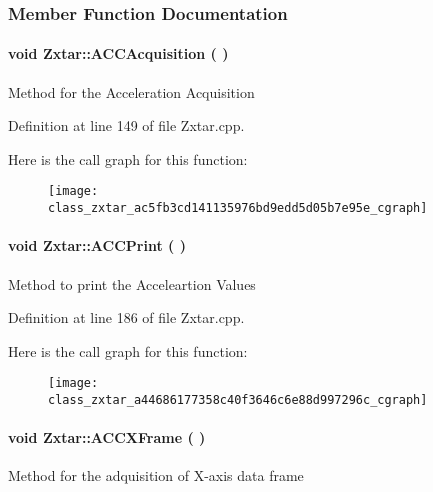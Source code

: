 \begin{appendices}
\subsubsection{\-Member \-Function \-Documentation}
\paragraph[{\-A\-C\-C\-Acquisition}]{\setlength{\rightskip}{0pt plus 5cm}void {\bf \-Zxtar\-::\-A\-C\-C\-Acquisition} (
)}\label{class_zxtar_ac5fb3cd141135976bd9edd5d05b7e95e}
\-Method for the \-Acceleration \-Acquisition 

\-Definition at line 149 of file \-Zxtar.\-cpp.



\-Here is the call graph for this function\-:\nopagebreak
\begin{figure}[H]
\begin{center}
\leavevmode
\texttt{[image: class\_zxtar\_ac5fb3cd141135976bd9edd5d05b7e95e\_cgraph]}
\end{center}
\end{figure}


\paragraph[{\-A\-C\-C\-Print}]{\setlength{\rightskip}{0pt plus 5cm}void {\bf \-Zxtar\-::\-A\-C\-C\-Print} (
)}\label{class_zxtar_a44686177358c40f3646c6e88d997296c}
\-Method to print the \-Acceleartion \-Values 

\-Definition at line 186 of file \-Zxtar.\-cpp.



\-Here is the call graph for this function\-:\nopagebreak
\begin{figure}[H]
\begin{center}
\leavevmode
\texttt{[image: class\_zxtar\_a44686177358c40f3646c6e88d997296c\_cgraph]}
\end{center}
\end{figure}


\paragraph[{\-A\-C\-C\-X\-Frame}]{\setlength{\rightskip}{0pt plus 5cm}void {\bf \-Zxtar\-::\-A\-C\-C\-X\-Frame} (
)}\label{class_zxtar_aaef8fc83168462e070d4eb2884c6faba}
\-Method for the adquisition of \-X-\/axis data frame 


\end{appendices}
